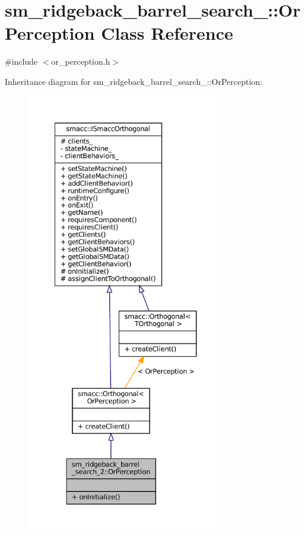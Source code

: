 \hypertarget{classsm__ridgeback__barrel__search__2_1_1OrPerception}{}\section{sm\+\_\+ridgeback\+\_\+barrel\+\_\+search\+\_\+:\+:Or\+Perception Class Reference}
\label{classsm__ridgeback__barrel__search__2_1_1OrPerception}


{\ttfamily \#include $<$or\+\_\+perception.\+h$>$}



Inheritance diagram for sm\+\_\+ridgeback\+\_\+barrel\+\_\+search\+\_\+:\+:Or\+Perception\+:
\nopagebreak
\begin{figure}[H]
\begin{center}
\leavevmode
\includegraphics[height=550pt]{classsm__ridgeback__barrel__search__2_1_1OrPerception__inherit__graph}
\end{center}
\end{figure}



